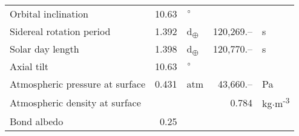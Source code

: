 \begin{tabular}{|p{4cm}|r l|r l|}
  Orbital inclination & 10.63 & $\degree$ & & \\
  Sidereal rotation period & 1.392 & d\textsubscript{$\oplus$} & 120,269.-- & s \\
  Solar day length & 1.398 & d\textsubscript{$\oplus$} & 120,770.-- & s \\
  Axial tilt & 10.63 & $\degree$ & & \\
  Atmospheric pressure at surface & 0.431 & atm & 43,660.-- & Pa \\
  Atmospheric density at surface & & & 0.784 & kg$\cdot$m\textsuperscript{-3} \\
  Bond albedo & 0.25 & & & \\
  \hline
\end{tabular}
\newpage
